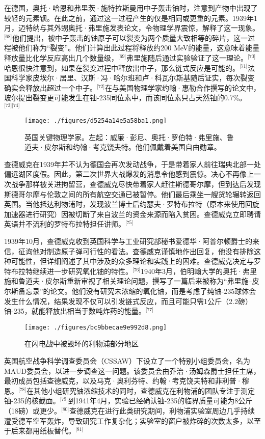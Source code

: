在德国，奥托·哈恩和弗里茨·施特拉斯曼用中子轰击铀时，注意到产物中出现了较轻的元素钡。在此之前，通过这一过程产生的仅是相同或更重的元素。1939年1月，迈特纳与其外甥奥托·弗里施发表论文，令物理学界震惊，解释了这一现象。\(^\text{[68]}\)他们提出，被中子轰击的铀原子可以裂变为两个质量大致相等的碎片，这一过程被他们称为“裂变”。他们计算出此过程将释放约200 MeV的能量，这意味着能量释放量比化学反应高出几个数量级，\(^\text{[69]}\)弗里施随后通过实验验证了这一理论。\(^\text{[70]}\)哈恩很快注意到，如果在裂变过程中释放出中子，那么链式反应是可能的。\(^\text{[71]}\)法国科学家皮埃尔·居里、汉斯·冯·哈尔班和卢·科瓦尔斯基随后证实，每次裂变确实会释放出超过一个中子。\(^\text{[72]}\)在与美国物理学家约翰·惠勒合作撰写的论文中，玻尔提出裂变更可能发生在铀-235同位素中，而该同位素只占天然铀的0.7\%。\(^\text{[73][74]}\)
\begin{figure}[ht]
\centering
\texttt{[image: ./figures/d5254a14e5a58ba1.png]}
\caption{英国关键物理学家。左起：威廉·彭尼、奥托·罗伯特·弗里施、鲁道夫·皮尔斯和约翰·考克饶夫特。他们佩戴着美国自由勋章。} \label{fig_ZMcdw_4}
\end{figure}
查德威克在1939年并不认为德国会再次发动战争，于是带着家人前往瑞典北部一处偏远湖区度假。因此，第二次世界大战爆发的消息令他感到震惊。决心不再像上一次战争那样被关进拘留营，查德威克尽快带着家人赶往斯德哥尔摩，但到达后发现斯德哥尔摩与伦敦之间的所有航空交通已被暂停。他们最后乘坐一艘货轮辗转返回英国。当他抵达利物浦时，发现波兰博士后约瑟夫·罗特布拉特（原本来使用回旋加速器进行研究）因被切断了来自波兰的资金来源而陷入贫困。查德威克立即聘请英语并不流利的罗特布拉特担任讲师。\(^\text{[75]}\)

1939年10月，查德威克收到英国科学与工业研究部秘书爱德华·阿普尔顿爵士的来信，征询他对制造原子弹可行性的看法。查德威克谨慎地作出回复，他没有排除这种可能性，但详细阐述了其中涉及的众多理论和实践上的困难。查德威克决定与罗特布拉特继续进一步研究氧化铀的特性。\(^\text{[76]}\)1940年3月，伯明翰大学的奥托·弗里施和鲁道夫·皮尔斯重新审视了相关理论问题，撰写了一篇后来被称为“弗里施–皮尔斯备忘录”的论文。他们没有研究未浓缩的氧化铀，而是考虑了纯铀-235球体会发生什么情况，结果发现不仅可以引发链式反应，而且可能只需1公斤（2.2磅）铀-235，就能释放出相当于数吨炸药的能量。\(^\text{[77]}\)
\begin{figure}[ht]
\centering
\texttt{[image: ./figures/bc9bbecae9e992d8.png]}
\caption{在闪电战中被毁坏的利物浦部分地区} \label{fig_ZMcdw_5}
\end{figure}
英国航空战争科学调查委员会（CSSAW）下设立了一个特别小组委员会，名为 MAUD委员会，以进一步调查这一问题。该委员会由乔治·汤姆森爵士担任主席，最初成员包括查德威克，以及马克·奥利芬特、约翰·考克饶夫特和菲利普·穆恩。\(^\text{[78]}\)在其他小组研究铀浓缩技术的同时，查德威克在利物浦的团队专注于测定铀-235的核截面。\(^\text{[79]}\)到1941年4月，实验已经确认铀-235的临界质量可能为8公斤（18磅）或更少。\(^\text{[80]}\)查德威克在进行此类研究期间，利物浦实验室周边几乎持续遭受德军空军轰炸，导致研究工作复杂化；实验室的窗户被炸碎的次数太多，以至于后来都用纸板替代。\(^\text{[81]}\)

